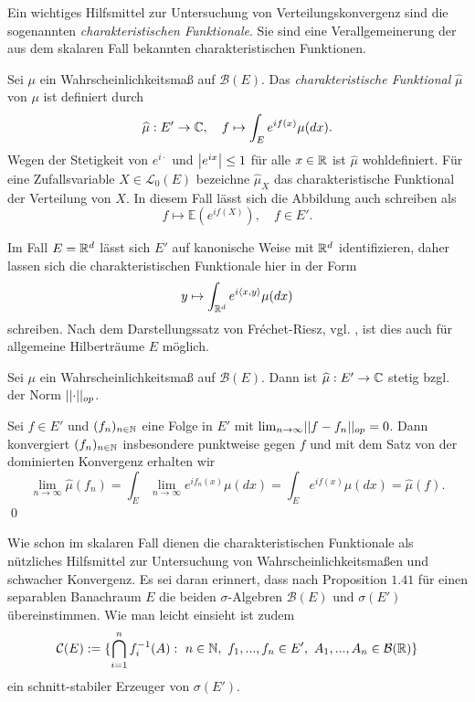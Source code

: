 Ein wichtiges Hilfsmittel zur Untersuchung von Verteilungskonvergenz sind die sogenannten \textit{charakteristischen Funktionale}. 
Sie sind eine Verallgemeinerung der aus dem skalaren Fall bekannten charakteristischen Funktionen.   

\begin{mydef}
    Sei $\mu$ ein Wahrscheinlichkeitsmaß auf $\mathcal{B}(E)$. 
    Das \textit{charakteristische Funktional} $\widehat{\mu}$ von $\mu$ ist definiert durch
    $$
        \widehat{\mu} : E' \to \mathbb{C}, \quad f \mapsto \int_{E}e^{if(x)}\mu(dx).
    $$
    Wegen der Stetigkeit von $e^{i\cdot}$ und $\left| e^{ix} \right|\leq 1$ für alle $x \in \mathbb{R}$ ist $\widehat{\mu}$ wohldefiniert. 
    Für eine Zufallsvariable $X \in \mathcal{L}_0(E)$ bezeichne $\widehat{\mu}_X$ das charakteristische Funktional der Verteilung von $X$. In diesem Fall lässt sich die Abbildung auch schreiben als
    $$
        f \mapsto \mathbb{E}(e^{if(X)}), \quad f \in E'. 
    $$
\end{mydef}

\begin{remark}
    Im Fall $E = \mathbb{R}^d$ lässt sich $E'$ auf kanonische Weise mit $\mathbb{R}^d$ identifizieren, daher lassen sich die charakteristischen Funktionale hier in der Form 
    $$
        y \mapsto \int_{\mathbb{R}^d}e^{i\langle x, y\rangle}\mu(dx)
    $$
    schreiben. Nach dem Darstellungssatz von Fréchet-Riesz, vgl. \cite[Theorem V.3.6]{werner}, ist dies auch für allgemeine Hilberträume $E$ möglich. 
\end{remark}

\begin{proposition}
    Sei $\mu$ ein Wahrscheinlichkeitsmaß auf $\mathcal{B}(E)$. Dann ist $\widehat{\mu}:E' \to \mathbb{C}$ stetig bzgl. der Norm $\lvert\lvert \cdot \rvert\rvert_{op}$. 
\end{proposition}
\begin{proof*}
    Sei $f \in E'$ und $(f_n)_{n \in \mathbb{N}}$ eine Folge in $E'$ mit $\lim_{n \to \infty}\lvert\lvert f-f_n \rvert\rvert_{op} = 0$. 
    Dann konvergiert $(f_n)_{n \in \mathbb{N}}$ insbesondere punktweise gegen $f$ und mit dem Satz von der dominierten Konvergenz erhalten wir 
    $$
        \lim_{n \to \infty} \widehat{\mu}(f_n) = \int_E\lim_{n \to \infty}e^{if_n(x)}\mu(dx) = \int_E e^{if(x)}\mu(dx) = \widehat{\mu}(f). 
    $$
    \qed
\end{proof*}

Wie schon im skalaren Fall dienen die charakteristischen Funktionale als nützliches Hilfsmittel zur Untersuchung von Wahrscheinlichkeitsmaßen und schwacher Konvergenz.
Es sei daran erinnert, dass nach Proposition $1.41$ für einen separablen Banachraum $E$ die beiden $\sigma$-Algebren $\mathcal{B}(E)$ und $\sigma(E')$ übereinstimmen. 
Wie man leicht einsieht ist zudem
$$
    \mathcal{C}(E) := \{ \bigcap_{i=1}^n f_i^{-1}(A): \ n \in \mathbb{N}, \ f_1,...,f_n \in E', \ A_1,...,A_n \in \mathcal{B}(\mathbb{R}) \}
$$ 
ein schnitt-stabiler Erzeuger von $\sigma(E')$. 

